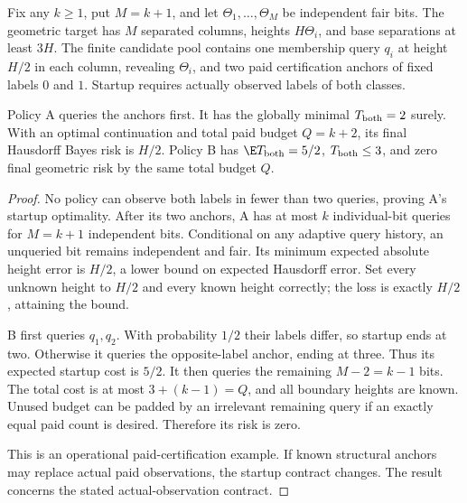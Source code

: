 \begin{counterexample}
\label{rthreegeo:discoverygeometry}
Fix any $k\ge1$, put $M=k+1$, and let
$\Theta_1,\ldots,\Theta_M$ be independent fair bits.
The geometric target has $M$ separated columns, heights $H\Theta_i$,
and base separations at least $3H$.
The finite candidate pool contains one membership query $q_i$ at height
$H/2$ in each column, revealing $\Theta_i$, and two paid certification
anchors of fixed labels $0$ and $1$.
Startup requires actually observed labels of both classes.

Policy A queries the anchors first. It has the globally minimal
$T_{\rm both}=2$ surely. With an optimal continuation and total paid
budget $Q=k+2$, its final Hausdorff Bayes risk is $H/2$.
Policy B has $\E T_{\rm both}=5/2$, $T_{\rm both}\le3$, and zero final
geometric risk by the same total budget $Q$.
\end{counterexample}
\begin{proof}
No policy can observe both labels in fewer than two queries, proving
A's startup optimality. After its two anchors, A has at most $k$
individual-bit queries for $M=k+1$ independent bits.
Conditional on any adaptive query history, an unqueried bit remains
independent and fair. Its minimum expected absolute height error is
$H/2$, a lower bound on expected Hausdorff error.
Set every unknown height to $H/2$ and every known height correctly;
the loss is exactly $H/2$, attaining the bound.

B first queries $q_1,q_2$. With probability $1/2$ their labels differ,
so startup ends at two. Otherwise it queries the opposite-label anchor,
ending at three. Thus its expected startup cost is $5/2$.
It then queries the remaining $M-2=k-1$ bits. The total cost is at most
$3+(k-1)=Q$, and all boundary heights are known. Unused budget can be
padded by an irrelevant remaining query if an exactly equal paid count
is desired. Therefore its risk is zero.

This is an operational paid-certification example. If known structural
anchors may replace actual paid observations, the startup contract
changes. The result concerns the stated actual-observation contract.
\end{proof}

